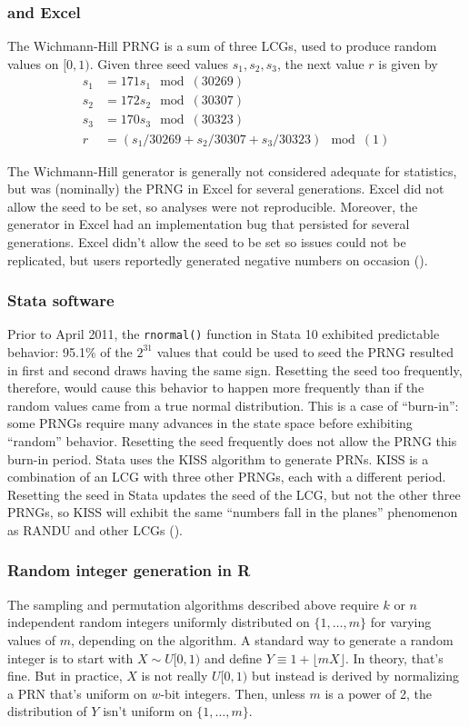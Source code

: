 \documentclass[12pt]{article}
\newcommand{\todo}[1]{{\color{red}{TO DO: \sc #1}}}
\begin{document}
\subsubsection{\citet{wichmann_algorithm_1982} and Excel}
The Wichmann-Hill PRNG is a sum of three LCGs, used to produce random values on $[0, 1)$.
Given three seed values $s_1, s_2, s_3$, the next value $r$ is given by
\begin{align*}
s_1 &= 171 s_1\mod(30269) \\
s_2 &= 172 s_2 \mod(30307) \\
s_3 &= 170 s_3 \mod(30323) \\
r &= (s_1/30269 + s_2/30307 + s_3/30323) \mod(1)
\end{align*}

The Wichmann-Hill generator is generally not considered adequate for statistics, but was (nominally) the PRNG in Excel for several generations. 
Excel did not allow the seed to be set, so analyses were not reproducible.
Moreover, the generator in Excel had an implementation bug that persisted for several generations.
Excel didn't allow the seed to be set so issues could not be replicated, but users reportedly generated negative numbers on occasion (\cite{mccullough_microsoft_2008}).

\subsubsection{Stata software}
Prior to April 2011, the \texttt{rnormal()} function in Stata 10 exhibited predictable behavior:
95.1\% of the $2^{31}$ values that could be used to seed the PRNG resulted in first and second draws having the same sign.
Resetting the seed too frequently, therefore, would cause this behavior to happen more frequently than if the 
random values came from a true normal distribution.
This is a case of ``burn-in'': some PRNGs require many advances in the state space before exhibiting ``random'' behavior.
Resetting the seed frequently does not allow the PRNG this burn-in period.
Stata uses the KISS algorithm to generate PRNs.
KISS is a combination of an LCG with three other PRNGs, each with a different period.
 \todo{describe KISS and cite Marsaglia}
Resetting the seed in Stata updates the seed of the LCG, but not the other three PRNGs, so KISS will exhibit the same
``numbers fall in the planes'' phenomenon as RANDU and other LCGs (\cite{ozier_perils_2012}).


\subsubsection{Random integer generation in R}
The sampling and permutation algorithms described above require $k$ or $n$ independent random integers
uniformly distributed on $\{1, \dots, m\}$ for varying values of $m$, depending on the algorithm.
A standard way to generate a random integer is to start with $X \sim U[0,1)$ and define $Y \equiv 1 + \lfloor mX \rfloor$. 
In theory, that's fine. 
But in practice, $X$ is not really $U[0,1)$ but instead is derived by normalizing a PRN that's uniform on $w$-bit integers. 
Then, unless $m$ is a power of 2, the distribution of $Y$ isn't uniform on $\{1, \ldots, m\}$. 
\end{document}
